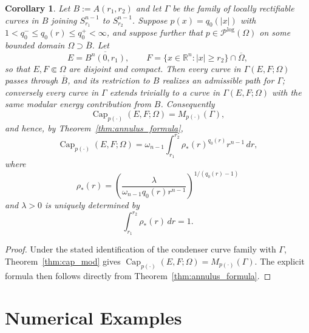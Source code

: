 \documentclass[12pt]{amsart}
\numberwithin{equation}{section}
\theoremstyle{plain}
\newtheorem{corollary}[equation]{Corollary}
\theoremstyle{definition}
\begin{document}
\begin{corollary}
\label{cor:annular_capacity}
Let $B:=A(r_1,r_2)$ and let $\Gamma$ be the family of locally rectifiable curves in $B$ joining $S_{r_1}^{n-1}$ to $S_{r_2}^{n-1}$. Suppose $p(x)=q_0(|x|)$ with $1<q_0^-\le q_0(r)\le q_0^+<\infty$, and suppose further that $p\in\mathcal P^{\log}(\Omega)$ on some bounded domain $\Omega\supset\overline{B}$. Let
\begin{equation*}
E=\overline{B^n(0,r_1)}, \qquad F=\{x\in\mathbb R^n:|x|\ge r_2\}\cap\overline\Omega,
\end{equation*}
so that $E,F\Subset\Omega$ are disjoint and compact. Then every curve in $\Gamma(E,F;\Omega)$ passes through $\overline B$, and its restriction to $B$ realizes an admissible path for $\Gamma$; conversely every curve in $\Gamma$ extends trivially to a curve in $\Gamma(E,F;\Omega) $ with the same modular energy contribution from $B$. Consequently
\begin{equation*}
\operatorname{Cap}_{p(\cdot)}(E,F;\Omega) = M_{p(\cdot)}(\Gamma),
\end{equation*}
and hence, by Theorem~\ref{thm:annulus_formula},
\begin{equation}
\label{eq:annular_capacity_formula}
\operatorname{Cap}_{p(\cdot)}(E,F;\Omega) = \omega_{n-1} \int_{r_1}^{r_2} \rho_*(r)^{q_0(r)}r^{n-1}\,dr,
\end{equation}
where
\begin{equation*}
\rho_*(r) = \left( \frac{\lambda}{\omega_{n-1}q_0(r)r^{n-1}} \right)^{\!1/(q_0(r)-1)}
\end{equation*}
and $\lambda>0$ is uniquely determined by
\begin{equation*}
\int_{r_1}^{r_2}\rho_*(r)\,dr=1.
\end{equation*}
\end{corollary}

\begin{proof}
Under the stated identification of the condenser curve family with $\Gamma$, Theorem~\ref{thm:cap_mod} gives $\operatorname{Cap}_{p(\cdot)}(E,F;\Omega) = M_{p(\cdot)}(\Gamma).$ The explicit formula then follows directly from Theorem~\ref{thm:annulus_formula}.
\end{proof}

\section{Numerical Examples}
\label{sec:computational}
\end{document}
